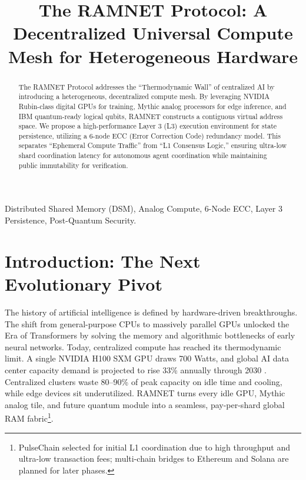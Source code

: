 \documentclass[conference]{IEEEtran}
\begin{document}
\title{The RAMNET Protocol: A Decentralized Universal Compute Mesh for Heterogeneous Hardware}

\author{
}

\maketitle

\begin{abstract}
The RAMNET Protocol addresses the ``Thermodynamic Wall'' of centralized AI by introducing a heterogeneous, decentralized compute mesh. By leveraging NVIDIA Rubin-class digital GPUs for training, Mythic analog processors for edge inference, and IBM quantum-ready logical qubits, RAMNET constructs a contiguous virtual address space. We propose a high-performance Layer 3 (L3) execution environment for state persistence, utilizing a 6-node ECC (Error Correction Code) redundancy model. This separates ``Ephemeral Compute Traffic'' from ``L1 Consensus Logic,'' ensuring ultra-low shard coordination latency for autonomous agent coordination while maintaining public immutability for verification.
\end{abstract}

\begin{IEEEkeywords}
Distributed Shared Memory (DSM), Analog Compute, 6-Node ECC, Layer 3 Persistence, Post-Quantum Security.
\end{IEEEkeywords}

\section{Introduction: The Next Evolutionary Pivot}
The history of artificial intelligence is defined by hardware-driven breakthroughs. The shift from general-purpose CPUs to massively parallel GPUs unlocked the Era of Transformers by solving the memory and algorithmic bottlenecks of early neural networks. Today, centralized compute has reached its thermodynamic limit. A single NVIDIA H100 SXM GPU draws 700 Watts, and global AI data center capacity demand is projected to rise 33\% annually through 2030 \cite{mckinsey2024ai}. Centralized clusters waste 80--90\% of peak capacity on idle time and cooling, while edge devices sit underutilized. RAMNET turns every idle GPU, Mythic analog tile, and future quantum module into a seamless, pay-per-shard global RAM fabric\footnote{PulseChain selected for initial L1 coordination due to high throughput and ultra-low transaction fees; multi-chain bridges to Ethereum and Solana are planned for later phases.}.
\end{document}
